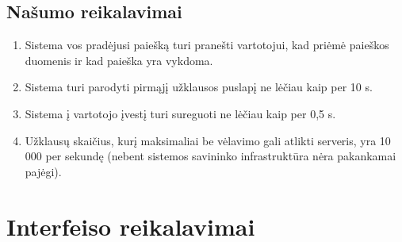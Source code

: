 \documentclass[12pt]{article}
\begin{document}
	\subsection{Našumo reikalavimai}
	\begin{enumerate}[labelindent=10pt,leftmargin=2.2cm]
		\item Sistema vos pradėjusi paiešką turi pranešti vartotojui, kad priėmė paieškos duomenis ir kad paieška yra vykdoma.
		\item Sistema turi parodyti pirmąjį užklausos puslapį ne lėčiau kaip per 10 s.
		\item Sistema į vartotojo įvestį turi sureguoti ne lėčiau kaip per 0,5 s.
		\item Užklausų skaičius, kurį maksimaliai be vėlavimo gali atlikti serveris, yra 10 000 per sekundę (nebent sistemos savininko infrastruktūra nėra pakankamai pajėgi).
	\end{enumerate}
	
	\pagebreak
	\renewcommand{\thesubsection}{IR\arabic{subsection}}
	\section*{Interfeiso reikalavimai}	
	\setcounter{subsection}{0}	
\end{document}
